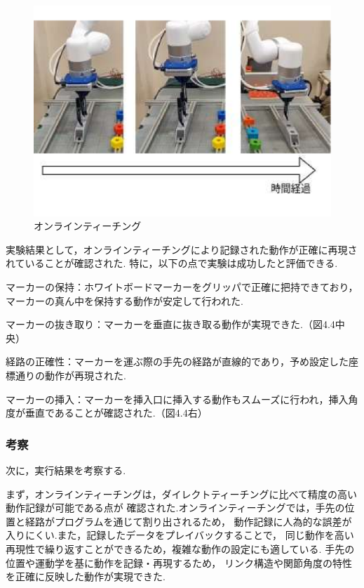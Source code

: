 \begin{figure}[h]
  \centering
  \includegraphics[scale=0.3]{sozai/6.pdf}
  \caption{オンラインティーチング}
\end{figure}

実験結果として，オンラインティーチングにより記録された動作が正確に再現されていることが確認された.
特に，以下の点で実験は成功したと評価できる.

マーカーの保持：ホワイトボードマーカーをグリッパで正確に把持できており，マーカーの真ん中を保持する動作が安定して行われた.

マーカーの抜き取り：マーカーを垂直に抜き取る動作が実現できた.（図4.4中央）

経路の正確性：マーカーを運ぶ際の手先の経路が直線的であり，予め設定した座標通りの動作が再現された.

マーカーの挿入：マーカーを挿入口に挿入する動作もスムーズに行われ，挿入角度が垂直であることが確認された.（図4.4右）

\subsubsection{考察}
次に，実行結果を考察する.

まず，オンラインティーチングは，ダイレクトティーチングに比べて精度の高い動作記録が可能である点が
確認された.オンラインティーチングでは，手先の位置と経路がプログラムを通じて割り出されるため，
動作記録に人為的な誤差が入りにくい.また，記録したデータをプレイバックすることで，
同じ動作を高い再現性で繰り返すことができるため，複雑な動作の設定にも適している.
手先の位置や運動学を基に動作を記録・再現するため，
リンク構造や関節角度の特性を正確に反映した動作が実現できた.

